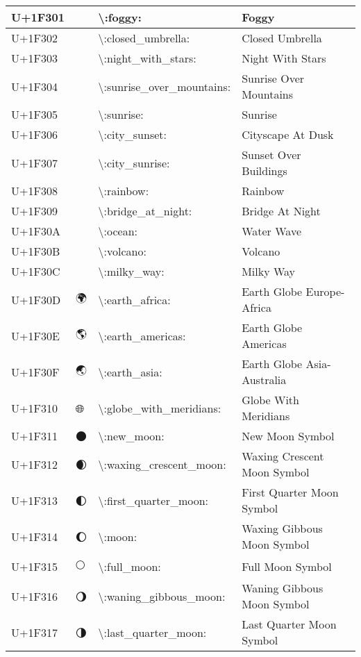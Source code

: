 \begin{table}[h]
\begin{tabulary}{\linewidth}{|L|L|L|L|}
\hline
U+1F301 & 🌁 & {\textbackslash}:foggy: & Foggy \\
\hline
U+1F302 & 🌂 & {\textbackslash}:closed\_umbrella: & Closed Umbrella \\
\hline
U+1F303 & 🌃 & {\textbackslash}:night\_with\_stars: & Night With Stars \\
\hline
U+1F304 & 🌄 & {\textbackslash}:sunrise\_over\_mountains: & Sunrise Over Mountains \\
\hline
U+1F305 & 🌅 & {\textbackslash}:sunrise: & Sunrise \\
\hline
U+1F306 & 🌆 & {\textbackslash}:city\_sunset: & Cityscape At Dusk \\
\hline
U+1F307 & 🌇 & {\textbackslash}:city\_sunrise: & Sunset Over Buildings \\
\hline
U+1F308 & 🌈 & {\textbackslash}:rainbow: & Rainbow \\
\hline
U+1F309 & 🌉 & {\textbackslash}:bridge\_at\_night: & Bridge At Night \\
\hline
U+1F30A & 🌊 & {\textbackslash}:ocean: & Water Wave \\
\hline
U+1F30B & 🌋 & {\textbackslash}:volcano: & Volcano \\
\hline
U+1F30C & 🌌 & {\textbackslash}:milky\_way: & Milky Way \\
\hline
U+1F30D & 🌍 & {\textbackslash}:earth\_africa: & Earth Globe Europe-Africa \\
\hline
U+1F30E & 🌎 & {\textbackslash}:earth\_americas: & Earth Globe Americas \\
\hline
U+1F30F & 🌏 & {\textbackslash}:earth\_asia: & Earth Globe Asia-Australia \\
\hline
U+1F310 & 🌐 & {\textbackslash}:globe\_with\_meridians: & Globe With Meridians \\
\hline
U+1F311 & 🌑 & {\textbackslash}:new\_moon: & New Moon Symbol \\
\hline
U+1F312 & 🌒 & {\textbackslash}:waxing\_crescent\_moon: & Waxing Crescent Moon Symbol \\
\hline
U+1F313 & 🌓 & {\textbackslash}:first\_quarter\_moon: & First Quarter Moon Symbol \\
\hline
U+1F314 & 🌔 & {\textbackslash}:moon: & Waxing Gibbous Moon Symbol \\
\hline
U+1F315 & 🌕 & {\textbackslash}:full\_moon: & Full Moon Symbol \\
\hline
U+1F316 & 🌖 & {\textbackslash}:waning\_gibbous\_moon: & Waning Gibbous Moon Symbol \\
\hline
U+1F317 & 🌗 & {\textbackslash}:last\_quarter\_moon: & Last Quarter Moon Symbol \\

\end{tabulary}
\end{table}
